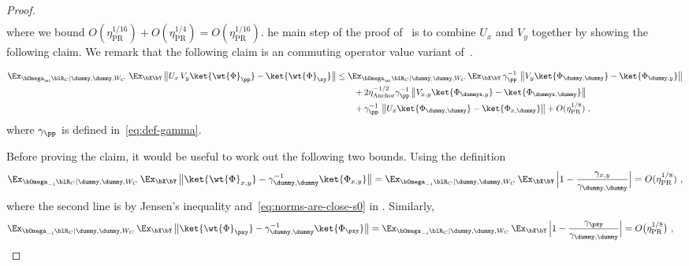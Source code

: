 \begin{proof}
\begin{align}
	\end{align}
	where we bound $O(\eta_{\text{PR}}^{1/16}) + O(\eta_{\text{PR}}^{1/4}) = O(\eta_{\text{PR}}^{1/16})$. 	he main step of the proof of~ is to combine $U_x$ and $V_y$ together by showing the following claim. We remark that the following claim is an commuting operator value variant of~\cite[Claim 5.19]{bavarianAnchoredParallelRepetition2021}. 
	\begin{claim}\label{claim:good-i-2}
		\begin{align}
			\Ex_{\bOmega_{\mi} \blR_C | \dummy,\dummy,W_C} \,\, \Ex_{\bX \bY} \, \big \| U_{x} \, V_{y} \ket{\wt{\Phi}_{\pp}} - \ket{\wt{\Phi}_{\xy}} \big\|  
			&\leq 	\Ex_{\bOmega_{\mi} \blR_C | \dummy,\dummy,W_C} \, \Ex_{\bX \bY} \, \gamma_\pp^{-1} \, \left \| V_y \ket{{\Phi}_{\dummy,\dummy}} - \ket{{\Phi}_{\dummy,y}} \right \|\label{eq:good-i-2a}\\
			&\qquad + 2\eta_{\text{Anchor}}^{-1/2} \gamma_\pp^{-1} \,\big \|  V_{x,y} \ket{\Phi_{\dummyx,y}} - \ket{{\Phi}_{\dummyx,\dummy}} \big \| \label{eq:good-i-2b}\\
			&\qquad + \gamma_\pp^{-1} \, \left \|  U_x \ket{{\Phi}_{\dummy,\dummy}} -  \ket{{\Phi}_{x,\dummy}} \right \| + O(\eta_{\text{PR}}^{1/8})\;,\label{eq:good-i-2c}
		\end{align}
	where $\gamma_\pp$ is defined in~\eqref{eq:def-gamma}. 
	\end{claim}
	Before proving the claim, it would be useful to work out the following two bounds. Using the definition
	\begin{equation}
		\Ex_{\bOmega_{-i} \blR_C| \dummy, \dummy, W_C} \, \Ex_{\bX \bY} \,  \big \|\ket{\wt{\Phi}_{x,y}} - \gamma_{\dummy,\dummy}^{-1}\ket{\Phi_{x,y}} \big \| 
		= \Ex_{\bOmega_{-i} \blR_C| \dummy, \dummy, W_C}  \,\Ex_{\bX \bY} \, \Big|1 - \frac{\gamma_{x,y}}{\gamma_{\dummy,\dummy}} \Big|  = O(\eta_{\text{PR}}^{1/8})~,\label{eq:local_operators-0}
	\end{equation}
	where the second line is by Jensen's inequality and~\eqref{eq:norms-are-close-s0} in . Similarly,
	\begin{align}
		\Ex_{\bOmega_{-i} \blR_C| \dummy, \dummy, W_C}  \, \Ex_{\bX \bY} \,  \big \|\ket{\wt{\Phi}_{\pxy}} - \gamma_{\dummy,\dummy}^{-1}\ket{\Phi_{\pxy}} \big \| &=\Ex_{\bOmega_{-i} \blR_C| \dummy, \dummy, W_C}  \,\Ex_{\bX \bY} \, \Big|1 - \frac{\gamma_{\pxy}}{\gamma_{\dummy,\dummy}} \Big| = O\big(\eta_{\text{PR}}^{1/8}\big)~,\label{eq:local_operators-0b}
	\end{align}

\end{proof}
